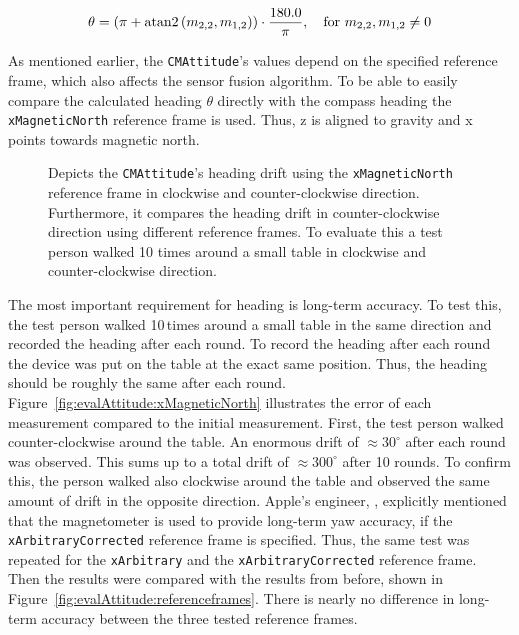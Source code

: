 \begin{equation} \label{eq:rotation2heading}
  \theta = (\pi + {\rm atan2}\left(m_{2,2} , m_{1,2}\right)) \cdot \frac{180.0}{\pi}, \quad \text{for } m_{2,2}, m_{1,2} \neq 0
\end{equation}

\noindent As mentioned earlier, the \texttt{CMAttitude}'s values depend on the specified reference frame, which also affects the sensor fusion algorithm. To be able to easily compare the calculated heading $\theta$ directly with the compass heading the \texttt{xMagneticNorth} reference frame is used. Thus, z is aligned to gravity and x points towards magnetic north.

\begin{figure}
	
	\caption{Depicts the \texttt{CMAttitude}'s heading drift using the \texttt{xMagneticNorth} reference frame in clockwise and counter-clockwise direction. Furthermore, it compares the heading drift in counter-clockwise direction using different reference frames. To evaluate this a test person walked 10 times around a small table in clockwise and counter-clockwise direction.}
\end{figure}

%	

The most important requirement for heading is long-term accuracy. To test this, the test person walked 10\,times around a small table in the same direction and recorded the heading after each round. To record the heading after each round the device was put on the table at the exact same position. Thus, the heading should be roughly the same after each round. Figure~\ref{fig:evalAttitude:xMagneticNorth} illustrates the error of each measurement compared to the initial measurement. First, the test person walked counter-clockwise around the table. An enormous drift of $\approx 30^{\circ}$ after each round was observed. This sums up to a total drift of $\approx 300^{\circ}$ after 10 rounds. To confirm this, the person walked also clockwise around the table and observed the same amount of drift in the opposite direction. Apple's engineer, \citet{apple:wwdc_2012_pham}, explicitly mentioned that the magnetometer is used to provide long-term yaw accuracy, if the \texttt{xArbitraryCorrected} reference frame is specified. Thus, the same test was repeated for the \texttt{xArbitrary} and the \texttt{xArbitraryCorrected} reference frame. Then the results were compared with the results from before, shown in Figure~\ref{fig:evalAttitude:referenceframes}. There is nearly no difference in long-term accuracy between the three tested reference frames.

